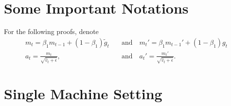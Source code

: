 \documentclass[11pt]{article}
\begin{document}
\newpage



\newpage
\appendix 


\section{Some Important Notations}
For the following proofs, denote
\begin{align*}
m_t=\beta_1 m_{t-1}+(1-\beta_1)\tilde g_t \quad & \textrm{and} \quad m_t'=\beta_1 m_{t-1}'+(1-\beta_1) g_t\\
    a_t=\frac{m_t}{\sqrt{\hat v_t+\epsilon}},\quad & \textrm{and} \quad  a_t'=\frac{m_t'}{\sqrt{\hat v_t+\epsilon}}.
\end{align*}

\section{Single Machine Setting}
\end{document}
